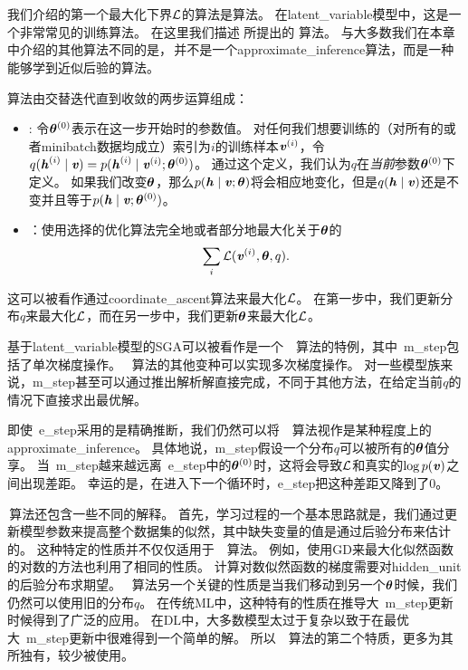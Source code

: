 \section{}
\label{sec:expectation_maximization}

我们介绍的第一个最大化下界$\mathcal{L}$的算法是算法。
在\gls{latent_variable}模型中，这是一个非常常见的训练算法。
在这里我们描述 \citet{emview} 所提出的\,\,算法。
与大多数我们在本章中介绍的其他算法不同的是，\,并不是一个\gls{approximate_inference}算法，而是一种能够学到近似后验的算法。


算法由交替迭代直到收敛的两步运算组成：
\begin{itemize}
\item {}: 令${\boldsymbol{\theta}^{(0)}}$表示在这一步开始时的参数值。
对任何我们想要训练的（对所有的或者\gls{minibatch}数据均成立）索引为$i$的训练样本$\boldsymbol{\mathit{v}}^{(i)}$，令$q(\boldsymbol{\mathit{h}}^{(i)}\mid \boldsymbol{\mathit{v}}) = p(\boldsymbol{\mathit{h}}^{(i)}\mid\boldsymbol{\mathit{v}}^{(i)};\boldsymbol{\theta}^{(0)})$。
通过这个定义，我们认为$q$在\emph{当前}参数$\boldsymbol{\theta}^{(0)}$下定义。
如果我们改变$\boldsymbol{\theta}$，那么$p(\boldsymbol{\mathit{h}}\mid\boldsymbol{\mathit{v}};\boldsymbol{\theta})$将会相应地变化，但是$q(\boldsymbol{\mathit{h}}\mid\boldsymbol{\mathit{v}})$还是不变并且等于$p(\boldsymbol{\mathit{h}}\mid\boldsymbol{\mathit{v}};\boldsymbol{\theta}^{(0)})$。
\item {}：使用选择的优化算法完全地或者部分地最大化关于$\boldsymbol{\theta}$的
\begin{align}
\sum_i \mathcal{L}(\boldsymbol{\mathit{v}}^{(i)},\boldsymbol{\theta},q).
\end{align}
\end{itemize}


这可以被看作通过\gls{coordinate_ascent}算法来最大化$\mathcal{L}$。
在第一步中，我们更新分布$q$来最大化$\mathcal{L}$，而在另一步中，我们更新$\boldsymbol{\theta}$来最大化$\mathcal{L}$。


基于\gls{latent_variable}模型的\gls{SGA}可以被看作是一个~~算法的特例，其中~\gls{m_step}包括了单次梯度操作。
~算法的其他变种可以实现多次梯度操作。
对一些模型族来说，\gls{m_step}甚至可以通过推出解析解直接完成，不同于其他方法，在给定当前$q$的情况下直接求出最优解。


即使~\gls{e_step}采用的是精确推断，我们仍然可以将~~算法视作是某种程度上的\gls{approximate_inference}。
具体地说，\gls{m_step}假设一个分布$q$可以被所有的$\boldsymbol{\theta}$值分享。
当~\gls{m_step}越来越远离~\gls{e_step}中的$\boldsymbol{\theta}^{(0)}$时，这将会导致$\mathcal{L}$和真实的$\log p(\boldsymbol{\mathit{v}})$之间出现差距。
幸运的是，在进入下一个循环时，\gls{e_step}把这种差距又降到了$0$。



\,算法还包含一些不同的解释。
首先，学习过程的一个基本思路就是，我们通过更新模型参数来提高整个数据集的似然，其中缺失变量的值是通过后验分布来估计的。
这种特定的性质并不仅仅适用于~~算法。
例如，使用\gls{GD}来最大化似然函数的对数的方法也利用了相同的性质。
计算对数似然函数的梯度需要对\gls{hidden_unit}的后验分布求期望。 
~算法另一个关键的性质是当我们移动到另一个$\boldsymbol{\theta}$时候，我们仍然可以使用旧的分布$q$。
在传统\gls{ML}中，这种特有的性质在推导大~\gls{m_step}更新时候得到了广泛的应用。
在\gls{DL}中，大多数模型太过于复杂以致于在最优大~\gls{m_step}更新中很难得到一个简单的解。
所以~~算法的第二个特质，更多为其所独有，较少被使用。


